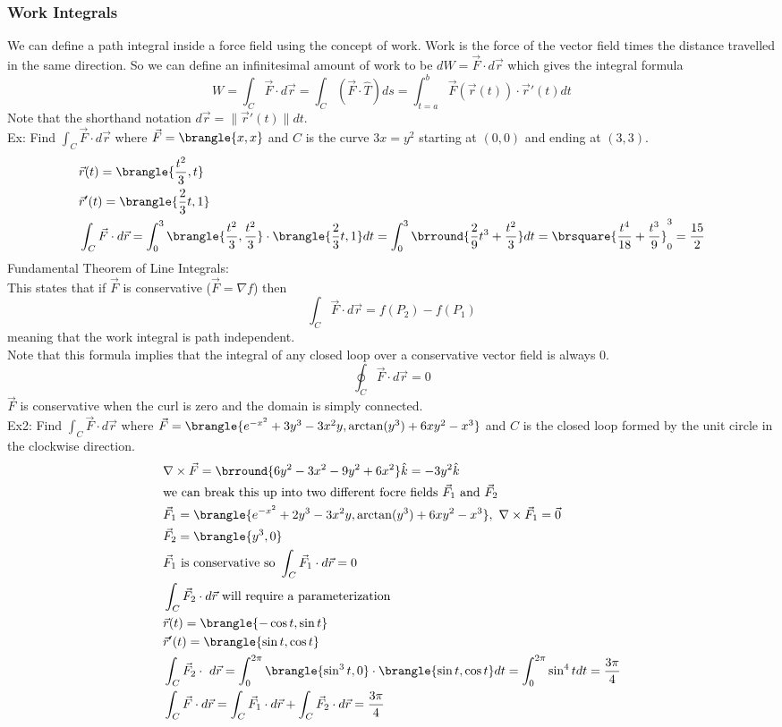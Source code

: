 \subsubsection{Work Integrals}
We can define a path integral inside a force field using the concept of work. Work is the force of the vector field times the distance travelled in the same direction. So we can define an infinitesimal amount of work to be $dW=\vec{F}\cdot d\vec{r}$ which gives the integral formula
$$W=\int_C\vec{F}\cdot d\vec{r}=\int_C(\vec{F}\cdot\hat{T})ds=\int_{t=a}^b\vec{F}(\vec{r}(t))\cdot\vec{r}'(t)dt$$
Note that the shorthand notation $d\vec{r}=\|\vec{r}'(t)\|dt$.\\
Ex: Find $\int_C\vec{F}\cdot d\vec{r}$ where $\vec{F}=\brangle{x,x}$ and $C$ is the curve $3x=y^2$ starting at $(0,0)$ and ending at $(3,3)$.
\begin{align*}
    &\vec{r}(t)=\brangle{\frac{t^2}{3},t}\\
    &\vec{r}'(t)=\brangle{\frac{2}{3}t,1}\\
    &\int_C\vec{F}\cdot d\vec{r}=\int_0^3\brangle{\frac{t^2}{3},\frac{t^2}{3}}\cdot\brangle{\frac{2}{3}t,1}dt=\int_0^3\brround{\frac{2}{9}t^3+\frac{t^2}{3}}dt=\brsquare{\frac{t^4}{18}+\frac{t^3}{9}}_0^3=\frac{15}{2}
\end{align*}
Fundamental Theorem of Line Integrals:\\
This states that if $\vec{F}$ is conservative ($\vec{F}=\nabla f$) then
$$\int_C\vec{F}\cdot d\vec{r}=f(P_2)-f(P_1)$$
meaning that the work integral is path independent.\\
Note that this formula implies that the integral of any closed loop over a conservative vector field is always 0.
$$\oint_C\vec{F}\cdot d\vec{r}=0$$
$\vec{F}$ is conservative when the curl is zero and the domain is simply connected.\\
Ex2: Find $\int_C\vec{F}\cdot d\vec{r}$ where $\vec{F}=\brangle{e^{-x^2}+3y^3-3x^2y,\arctan(y^3)+6xy^2-x^3}$ and $C$ is the closed loop formed by the unit circle in the clockwise direction.
\begin{align*}
    &\nabla\times\vec{F}=\brround{6y^2-3x^2-9y^2+6x^2}\hat{k}=-3y^2\hat{k}\\
    &\text{we can break this up into two different focre fields $\vec{F}_1$ and $\vec{F}_2$}\\
    &\vec{F}_1=\brangle{e^{-x^2}+2y^3-3x^2y,\arctan(y^3)+6xy^2-x^3},\ \nabla\times\vec{F}_1=\vec{0}\\
    &\vec{F}_2=\brangle{y^3,0}\\
    &\vec{F}_1\text{ is conservative so }\int_C\vec{F}_1\cdot d\vec{r}=0\\
    &\int_C\vec{F}_2\cdot d\vec{r}\text{ will require a parameterization}\\
    &\vec{r}(t)=\brangle{-\cos t,\sin t}\\
    &\vec{r}'(t)=\brangle{\sin t,\cos t}\\
    &\int_C\vec{F}_2\cdot\ d\vec{r}=\int_0^{2\pi}\brangle{\sin^3 t,0}\cdot\brangle{\sin t,\cos t}dt=\int_0^{2\pi}\sin^4 tdt=\frac{3\pi}{4}\\
    &\int_C\vec{F}\cdot d\vec{r}=\int_C\vec{F}_1\cdot d\vec{r}+\int_C\vec{F}_2\cdot d\vec{r}=\frac{3\pi}{4}
\end{align*}
